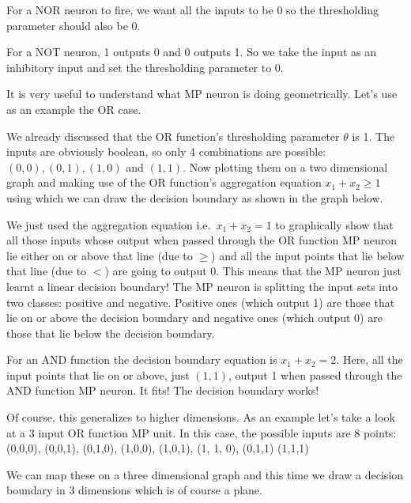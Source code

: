 \be
For a NOR neuron to fire, we want all the inputs to be 0 so the thresholding parameter should also be 0.


\ee

\be
For a NOT neuron, 1 outputs 0 and 0 outputs 1. So we take the input as an inhibitory input and set the thresholding
parameter to 0.


\ee

It is very useful to understand what MP neuron is doing geometrically. Let's use as an example the OR case.

\be
We already discussed that the OR function's thresholding parameter $\theta$ is 1. The inputs are obviously boolean,
so only 4 combinations are possible: $(0,0), (0,1), (1,0)$ and $(1,1)$. Now plotting them on a two dimensional graph
and making use of the OR function's aggregation equation $x_1 + x_2 \geq 1$ using which we can draw the decision
boundary as shown in the graph below.


We just used the aggregation equation i.e.\ $x_1 + x_2 = 1$ to graphically show that all those inputs whose output
when passed through the OR function MP neuron lie either on or above that line (due to $\geq$) and all the input
points that lie below that line (due to $<$) are going to output 0. This means that the MP neuron just learnt a
linear decision boundary! The MP neuron is splitting the input sets into two classes: positive and negative. Positive
ones (which output 1) are those that lie on or above the decision boundary and negative ones (which output 0) are
those that lie below the decision boundary.
\ee

\be
For an AND function the decision boundary equation is $x_1 + x_2 = 2$. Here, all the input points that lie on or
above, just $(1,1)$, output 1 when passed through the AND function MP neuron. It fits! The decision boundary works!


\ee

\be
Of course, this generalizes to higher dimensions. As an example let's take a look at a 3 input OR function MP unit. In
this case, the possible inputs are 8 points:
\bse
(0,0,0), (0,0,1), (0,1,0), (1,0,0), (1,0,1), (1, 1, 0), (0,1,1) (1,1,1)
\ese


We can map these on a three dimensional graph and this time we draw a decision boundary in 3 dimensions which is of
course a plane.


